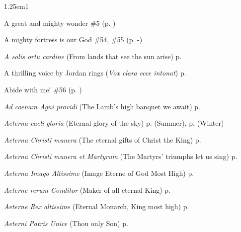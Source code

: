 {}
\fancyhead[RO,LE]{}
\fancyhead[RE,LO]{}


\small

\begin{hangparas}{1.25em}{1}
\par\noindent
A great and mighty wonder \dotfill \#5 (p. \pageref{Hymn5})
\par\noindent
A mighty fortress is our God \dotfill \#54, \#55 (p. \pageref{Hymn54}-\pageref{Hymn55})
\par\noindent
\textit{A solis ortu cardine} (From lands that see the sun arise) \dotfill p. \pageref{ChristmasMattinsHymn}
\par\noindent
A thrilling voice by Jordan rings (\textit{Vox clara ecce intonat}) \dotfill p. \pageref{FirstAdventMattins}
\par\noindent
Abide with me! \dotfill \#56 (p. \pageref{Hymn56})
\par\noindent
\textit{Ad coenam Agni providi} (The Lamb's high banquet we await) \dotfill p. \pageref{EasterDayEvensong}
\par\noindent
\textit{Aeterna caeli gloria} (Eternal glory of the sky) \dotfill p. \pageref{FridayMattinsSummer} (Summer), p. \pageref{FridayMattinsWinter} (Winter)
\par\noindent
\textit{Aeterna Christi munera} (The eternal gifts of Christ the King) \dotfill p. \pageref{ApostlesInvitatory}
\par\noindent
\textit{Aeterna Christi munera et Martyrum} (The Martyrs' triumphs let us sing) \dotfill p. \pageref{MartyrsInvitatory}
\par\noindent
\textit{Aeterna Imago Altissime} (Image Eterne of God Most High) \dotfill p. \pageref{ChristTheKingInvitatory}
\par\noindent
\textit{Aeterne rerum Conditor} (Maker of all eternal King) \dotfill p. \pageref{SundayMattinsWinter}
\par\noindent
\textit{Aeterne Rex altissime} (Eternal Monarch, King most high) \dotfill p. \pageref{AscensionInvitatoryHymn}
\par\noindent
\textit{Aeterni Patris Unice} (Thou only Son) \dotfill p. \pageref{MaryMagdaleneMattins}

\end{hangparas}
